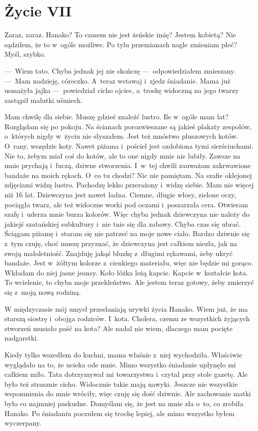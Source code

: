 \chapter{Życie VII}

Zaraz, zaraz. Hanako? To czasem nie jest żeńskie imię? Jestem kobietą? Nie sądziłem, że to w~ogóle możliwe. Po tylu przemianach nagle zmieniam płeć? Myśl, szybko.
 
---~Wiem tato. Chyba jednak jej nie skończę ---~odpowiedziałem zmieszany.
---~Mam nadzieję, córeczko. A~teraz wstawaj i~zjedz śniadanie. Mama już usmażyła jajka ---~powiedział cicho ojciec, a~troskę widoczną na jego twarzy zastąpił malutki uśmiech.

Mam chwilę dla siebie. Muszę gdzieś znaleźć lustro. Ile w~ogóle mam lat? Rozglądam się po pokoju. Na ścianach porozwieszane są jakieś plakaty zespołów, o~których nigdy w~życiu nie słyszałem. Jest też mnóstwo pluszowych kotów. O~rany, wszędzie koty. Nawet piżama i~pościel jest ozdobiona tymi sierściuchami. Nie to, żebym miał coś do kotów, ale to one nigdy mnie nie lubiły. Zawsze na mnie prychają i~fuczą, dziwne stworzenia. I~w~tej chwili zauważam zakrwawione bandaże na moich rękach. O~co tu chodzi? Nic nie pamiętam. Na szafie oklejonej zdjęciami widzę lustro. Pochodzę lekko przerażony i~widzę siebie. Mam nie więcej niż 16 lat. Dziewczyna jest nawet ładna. Ciemne, długie włosy, zielone oczy, pociągła twarz, ale też widoczne worki pod oczami i~poszarzała cera. Otwieram szafę i~uderza mnie burza kolorów. Więc chyba jednak dziewczyna nie należy do jakiejś szatańskiej subkultury i~nie tnie się dla zabawy. Chyba czas się ubrać. Ściągam piżamę i~staram się nie patrzeć na moje nowe ciało. Bardzo dziwnie się z~tym czuję, choć muszę przyznać, że dziewczyna jest całkiem niezła, jak na swoją małoletniość. Znajduję jakąś bluzkę z~długimi rękawami, żeby ukryć bandaże. Jest w~żółtym kolorze z~cienkiego materiału, więc nie będzie mi gorąco. Wkładam do niej jasne jeansy. Koło łóżka leżą kapcie. Kapcie w~kształcie kota. To wcielenie, to chyba moje przekleństwo. Ale jestem teraz gotowy, żeby zmierzyć się z~moją nową rodziną.

W międzyczasie mój umysł przesłaniają urywki życia Hanako. Wiem już, że ma starszą siostrę i~obojga rodziców. I~kota. Cholera, czemu ze wszystkich żyjących stworzeń musiało paść na kota? Ale nadal nie wiem, dlaczego mam pocięte nadgarstki.

Kiedy tylko wszedłem do kuchni, mama właśnie z~niej wychodziła. Właściwie wyglądało na to, że ucieka ode mnie. Mimo wszystko śniadanie upłynęło mi całkiem miło. Tata dotrzymywał mi towarzystwa i~czytał przy stole gazetę. Ale było też strasznie cicho. Widocznie takie mają nawyki. Jeszcze nie wszystkie wspomnienia do mnie wróciły, więc czuję się dość dziwnie. Ale zachowanie matki było co najmniej paskudne. Domyślam się, że jest na mnie zła o~to, co zrobiła Hanako. Po śniadaniu poczułem się trochę lepiej, ale mimo wszystko byłem wyczerpany.

